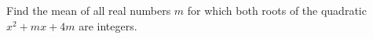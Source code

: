 Find the mean of all real numbers \(m\) for which both roots of the quadratic \(x^2+mx+4m\) are integers.
